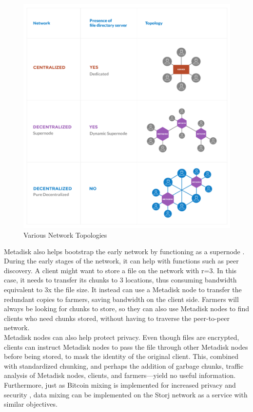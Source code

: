 \documentclass[a4paper,10pt]{article}
\begin{document}
\begin{figure}[h!]
\centering
\includegraphics[width=\linewidth]{7}
\caption{Various Network Topologies \cite{9}}
\end{figure}
Metadisk also helps bootstrap the early network by functioning as a supernode \cite{9}. During the early stages of the network, it can help with functions such as peer discovery. A client might want to store a file on the network with r=3. In this case, it needs to transfer its chunks to 3 locations, thus consuming bandwidth equivalent to 3x the file size. It instead can use a Metadisk node to transfer the redundant copies to farmers, saving bandwidth on the client side. Farmers will always be looking for chunks to store, so they can also use Metadisk nodes to find clients who need chunks stored, without having to traverse the peer-to-peer network.  \\

Metadisk nodes can also help protect privacy. Even though files are encrypted, clients can instruct Metadisk nodes to pass the file through other Metadisk nodes before being stored, to mask the identity of the original client. This, combined with standardized chunking, and perhaps the addition of garbage chunks, traffic analysis of Metadisk nodes, clients, and farmers—yield no useful information. Furthermore, just as Bitcoin mixing is implemented for increased privacy and security \cite{10}, data mixing can be implemented on the Storj network as a service with similar objectives. \\
\end{document}
